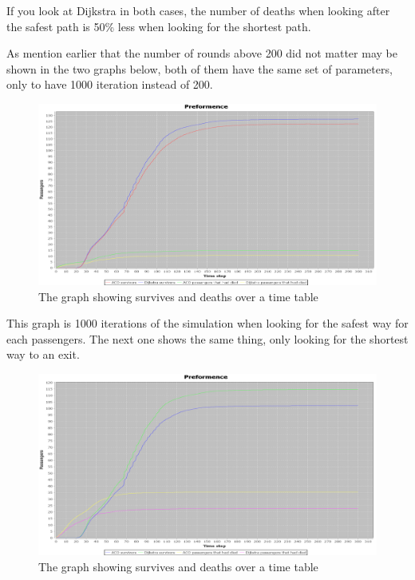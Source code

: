 If you look at Dijkstra in both cases, the number of deaths when looking after the safest path is 50\% less when looking for the shortest path.

As mention earlier that the number of rounds above 200 did not matter may be shown in the two graphs below, both of them have the same set of parameters, only to have 1000 iteration instead of 200.

\begin{figure} [h]
\centering
\hspace*{-5.5in}
\includegraphics[scale=0.35]{images/Graph using 1000 rounds 140 passangers-safest path and one fire.png}
\caption{The graph showing survives and deaths over a time table}
\label{fig:celebSafty1000round}
\end{figure}

This graph is 1000 iterations of the simulation when looking for the safest way for each passengers. The next one shows the same thing, only looking for the shortest way to an exit.

\begin{figure} [h]
\centering
\hspace*{-5.5in}
\includegraphics[scale=0.35]{images/Graph using 1000 rounds 140 passangers-shortest path and one fire.png}
\caption{The graph showing survives and deaths over a time table}
\label{fig:celebShort1000round}
\end{figure}


